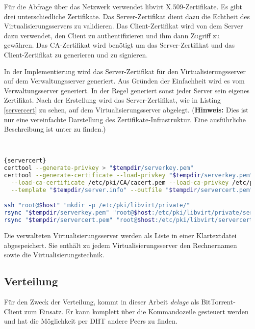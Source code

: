 { \fontsize{12.3pt}{16.8pt}\selectfont
Für die Abfrage über das Netzwerk verwendet libvirt X.509-Zertifikate. Es gibt drei unterschiedliche Zertifikate. Das Server-Zertifikat dient dazu die Echtheit des Virtualisierungsservers zu validieren. Das Client-Zertifikat wird von dem Server dazu verwendet, den Client zu authentifizieren und ihm dann Zugriff zu gewähren. Das CA-Zertifikat wird benötigt um das Server-Zertifikat und das Client-Zertifikat zu generieren und zu signieren.

In der Implementierung wird das Server-Zertifikat für den Virtualisierungsserver auf dem Verwaltungsserver generiert. Aus Gründen der Einfachheit wird es vom Verwaltungsserver generiert. In der Regel generiert sonst jeder Server sein eigenes Zertifikat. Nach der Erstellung wird das Server-Zertifikat, wie in Listing \ref{servercert} zu sehen, auf dem Virtualisierungsserver abgelegt. (\textbf{Hinweis:} Dies ist nur eine vereinfachte Darstellung des Zertifikate-Infrastruktur. Eine ausführliche Beschreibung ist unter \cite{Libvirttls} zu finden.) }
\\
\begin{lstlisting}[caption=Erstellung des Server-Zertifikats für den jeweiligen Virtualisierungsserver (servercert.sh),language=Bash,label=servercert]{servercert}
certtool --generate-privkey > "$tempdir/serverkey.pem"
certtool --generate-certificate --load-privkey "$tempdir/serverkey.pem" \
  --load-ca-certificate /etc/pki/CA/cacert.pem --load-ca-privkey /etc/pki/CA/private/cakey.pem \
  --template "$tempdir/server.info" --outfile "$tempdir/servercert.pem" 2> "/var/log/cow.log"

ssh "root@$host" "mkdir -p /etc/pki/libvirt/private/"
rsync "$tempdir/serverkey.pem" "root@$host:/etc/pki/libvirt/private/serverkey.pem"
rsync "$tempdir/servercert.pem" "root@$host:/etc/pki/libvirt/servercert.pem"
\end{lstlisting}

Die verwalteten Virtualisierungsserver werden als Liste in einer Klartextdatei abgespeichert. Sie enthält zu jedem Virtualisierungsserver den Rechnernamen sowie die Virtualisierungstechnik. \label{vhosts}

\subsection{Verteilung}\label{verteilung}
Für den Zweck der Verteilung, kommt in dieser Arbeit \textit{deluge} als BitTorrent-Client zum Einsatz. Er kann komplett über die Kommandozeile gesteuert werden und hat die Möglichkeit per DHT andere Peers zu finden.

